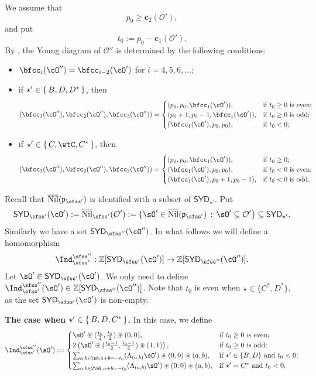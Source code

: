\documentclass[11pt,a4paper]{amsart}
\def\SYD{{\mathsf{SYD}}}
\newcommand{\CO}{{\mathcal {O}}}
\newcommand{\p}{\mathfrak p}
\newcommand{\Z}{\mathbb{Z}}
\numberwithin{equation}{section}
\theoremstyle{remark}
\def\subset{\subseteq}
\def\Nil{\overline{\mathrm{Nil}}}
\def\cOp{\cO^{\prime}}
\def\cOpp{\cO^{\prime\prime}}
\def\SYD{{\mathsf{SYD}}}
\begin{document}
We assume that
\[
p_0\geq \mathbf c_2(\CO'),
\]
and put
\[
  t_0:=p_0-\mathbf c_1(\CO').
\]
By \cite[Theorem 7.3.3]{CM}, the Young diagram of $\CO''$ is determined by the following conditions:
\begin{itemize}
    \item $\bfcc_i(\cOpp)=\bfcc_{i-2}(\cOp)$ for $i=4,5,6,\dots$;
    \item if $\star'\in \set{B,D, D^*}$,
    then
    \[
      (\bfcc_1(\cOpp), \bfcc_2(\cOpp),\bfcc_3(\cOpp))
      =\begin{cases}
        (p_0,p_0,\bfcc_1(\cOp)),     & \text{if $t_0\geq 0$ is even}; \\
          (p_0+1,p_0-1,\bfcc_1(\cOp)), & \text{if $t_0\geq 0$ is odd};  \\
          (\bfcc_1(\cOp),p_0,p_0),     & \text{if $t_0<0$};             \\
      \end{cases}
    \]
    \item  if $\star'\in \set{C,\wtC, C^*}$,
    then
    \[
      (\bfcc_1(\cOpp), \bfcc_2(\cOpp),\bfcc_3(\cOpp))
      =\begin{cases}
        (p_0,p_0,\bfcc_1(\cOp)),     & \text{if $t_0\geq 0$}; \\
        (\bfcc_1(\cOp),p_0,p_0), & \text{if $t_0 < 0$ is even};  \\
        (\bfcc_1(\cOp),p_0+1,p_0-1),     & \text{if $t_0<0$ is odd}.             \\
      \end{cases}
    \]
\end{itemize}


Recall that $\Nil(\p_{\sfss'})$ is identified with a subset of $\SYD_{\star'}$.  Put
\[
\SYD_{\sfss'}(\cO'):=\Nil_{\sfss'}(\CO'):=\{\sO'\in \Nil(\p_{\sfss'})\,:\, \sO'\subset \CO'\}\subset \SYD_{\star'}.
\]
Similarly we have a set  $\SYD_{\sfss''}(\cO'')$. In what follows we will define a homomorphism
\[
  \Ind_{\sfss'}^{\sfss''}: \Z[\SYD_{\sfss'}(\cO')] \rightarrow \Z[\SYD_{\sfss''}(\cO'')].
\]
Let $\sOp\in
\SYD_{\sfss'}(\cOp)$. We only need to define $\Ind_{\sfss'}^{\sfss''}(\sO')\in \Z[\SYD_{\sfss''}(\cO'')]$. Note that $t_0$ is even when $\star\in \{C^*, D^*\}$, as the set $\SYD_{\sfss'}(\cOp)$ is non-empty.

\medskip

{\bf The case when  $\star' \in \set{B,D, C^{*}}$.}
In this case, we define
\[
      \Ind_{\sfss'}^{\sfss''}(\sOp): =
      \begin{cases}
        \sOp\circledast (\frac{t_0}{2},\frac{t_0}{2})\circledast (0,0),
         & \text{if $t_0 \geq 0$ is even}; \\
        2  \left(\sOp\circledast (\frac{t_0-1}{2},\frac{t_0-1}{2})\circledast (1,1) \right),
         & \text{if $t_0\geq 0$ is odd};   \\
        \sum_{a,b\in \bN, a+b=-t_0}
        (\Lambda_{(a,b)}\sOp)\circledast(0,0)\circledast (a,b),
         & \text{if $\star'\in \{B,D\}$ and $t_0<0$};
         \\
         \sum_{a,b\in 2\bN, a+b=-t_0}
        (\Lambda_{(a,b)}\sOp)\circledast(0,0)\circledast (a,b),
         & \text{if $\star'=C^*$ and $t_0<0$}.
      \end{cases}
    \]
\end{document}

